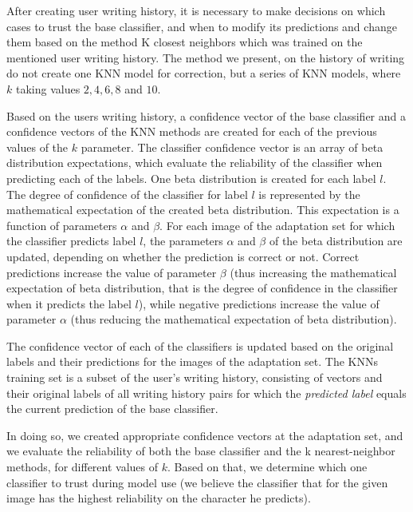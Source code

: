 \documentclass{article}
\begin{document}
After creating user writing history, it is necessary to make decisions on which cases to trust the base classifier, and when to modify its predictions and change them based on the method K closest neighbors
which was trained on the mentioned user writing history.
The method we present, on the history of writing do not create one KNN model for correction, but a series of KNN models, where $k$ taking values $2, 4, 6, 8$ and $10$.

Based on the users writing history, a confidence vector of the base classifier and a confidence vectors of the KNN methods are created for each of the previous values of the $k$ parameter.
The classifier confidence vector is an array of beta distribution expectations, which evaluate the reliability of the classifier when predicting each of the labels.
One beta distribution is created for each label $l$.
The degree of confidence of the classifier for label $l$ is represented by the mathematical expectation of the created beta distribution.
This expectation is a function of parameters $\alpha$  and $\beta$.
For each image of the adaptation set for which the classifier predicts label $l$, the parameters $\alpha$  and $\beta$ of the beta distribution are updated, depending on whether the prediction is correct or not.
Correct predictions increase the value of parameter $\beta$
(thus increasing the mathematical expectation of beta distribution, that is the degree of confidence in the classifier when it predicts the label $l$),
while negative predictions increase the value of parameter $\alpha$
(thus reducing the mathematical expectation of beta distribution).

The confidence vector of each of the classifiers is updated based on the original labels and their predictions for the images of the adaptation set.
The KNNs training set is a subset of the user's writing history, consisting of vectors and their original labels of all writing history pairs for
which the \textit{predicted label} equals the current prediction of the base classifier.

In doing so, we created appropriate confidence vectors at the adaptation set, and we evaluate the reliability of both the base classifier and the k nearest-neighbor methods, for different values of $k$.
Based on that, we determine which one classifier to trust during model use (we believe the classifier that for the given image has the highest reliability on the character he predicts).
\end{document}
